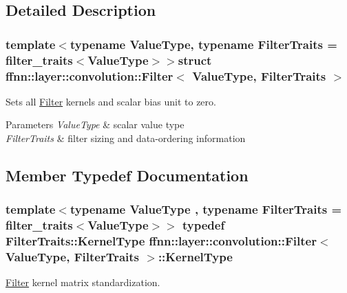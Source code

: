 \subsection{Detailed Description}
\subsubsection*{template$<$typename Value\-Type, typename Filter\-Traits = filter\-\_\-traits$<$\-Value\-Type$>$$>$struct ffnn\-::layer\-::convolution\-::\-Filter$<$ Value\-Type, Filter\-Traits $>$}

Sets all \hyperlink{structffnn_1_1layer_1_1convolution_1_1_filter}{Filter} kernels and scalar bias unit to zero. 


\begin{DoxyParams}{Parameters}
{\em Value\-Type} & scalar value type \\
\hline
{\em Filter\-Traits} & filter sizing and data-\/ordering information \\
\hline
\end{DoxyParams}


\subsection{Member Typedef Documentation}
\hypertarget{structffnn_1_1layer_1_1convolution_1_1_filter_a5366e7e916ee072b3a97bbbd1dc12b58}{
\subsubsection[{Kernel\-Type}]{\setlength{\rightskip}{0pt plus 5cm}template$<$typename Value\-Type , typename Filter\-Traits  = filter\-\_\-traits$<$\-Value\-Type$>$$>$ typedef Filter\-Traits\-::\-Kernel\-Type {\bf ffnn\-::layer\-::convolution\-::\-Filter}$<$ Value\-Type, Filter\-Traits $>$\-::{\bf Kernel\-Type}}}\label{structffnn_1_1layer_1_1convolution_1_1_filter_a5366e7e916ee072b3a97bbbd1dc12b58}


\hyperlink{structffnn_1_1layer_1_1convolution_1_1_filter}{Filter} kernel matrix standardization. 



